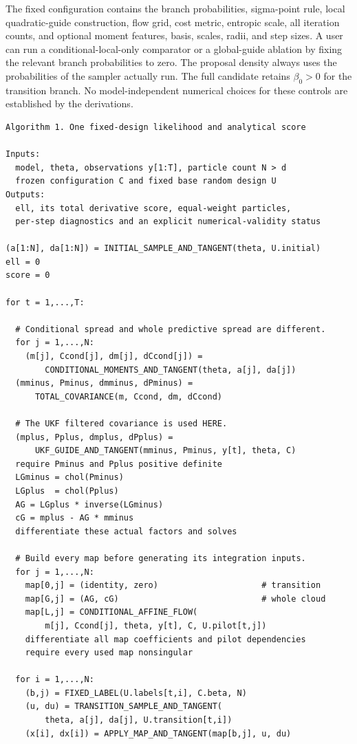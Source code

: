 The fixed configuration contains the branch probabilities, sigma-point rule,
local quadratic-guide construction, flow grid, cost metric, entropic scale,
all iteration counts, and optional moment features, basis, scales, radii,
and step sizes. A user can run a conditional-local-only comparator or a
global-guide ablation by fixing the relevant branch probabilities to zero.
The proposal density always uses the probabilities of the sampler actually
run. The full candidate retains \(\beta_0>0\) for the transition branch.
No model-independent numerical choices for these controls are established
by the derivations.

\begin{lstlisting}
Algorithm 1. One fixed-design likelihood and analytical score

Inputs:
  model, theta, observations y[1:T], particle count N > d
  frozen configuration C and fixed base random design U
Outputs:
  ell, its total derivative score, equal-weight particles,
  per-step diagnostics and an explicit numerical-validity status

(a[1:N], da[1:N]) = INITIAL_SAMPLE_AND_TANGENT(theta, U.initial)
ell = 0
score = 0

for t = 1,...,T:

  # Conditional spread and whole predictive spread are different.
  for j = 1,...,N:
    (m[j], Ccond[j], dm[j], dCcond[j]) =
        CONDITIONAL_MOMENTS_AND_TANGENT(theta, a[j], da[j])
  (mminus, Pminus, dmminus, dPminus) =
      TOTAL_COVARIANCE(m, Ccond, dm, dCcond)

  # The UKF filtered covariance is used HERE.
  (mplus, Pplus, dmplus, dPplus) =
      UKF_GUIDE_AND_TANGENT(mminus, Pminus, y[t], theta, C)
  require Pminus and Pplus positive definite
  LGminus = chol(Pminus)
  LGplus  = chol(Pplus)
  AG = LGplus * inverse(LGminus)
  cG = mplus - AG * mminus
  differentiate these actual factors and solves

  # Build every map before generating its integration inputs.
  for j = 1,...,N:
    map[0,j] = (identity, zero)                     # transition
    map[G,j] = (AG, cG)                             # whole cloud
    map[L,j] = CONDITIONAL_AFFINE_FLOW(
        m[j], Ccond[j], theta, y[t], C, U.pilot[t,j])
    differentiate all map coefficients and pilot dependencies
    require every used map nonsingular

  for i = 1,...,N:
    (b,j) = FIXED_LABEL(U.labels[t,i], C.beta, N)
    (u, du) = TRANSITION_SAMPLE_AND_TANGENT(
        theta, a[j], da[j], U.transition[t,i])
    (x[i], dx[i]) = APPLY_MAP_AND_TANGENT(map[b,j], u, du)


\end{lstlisting}

